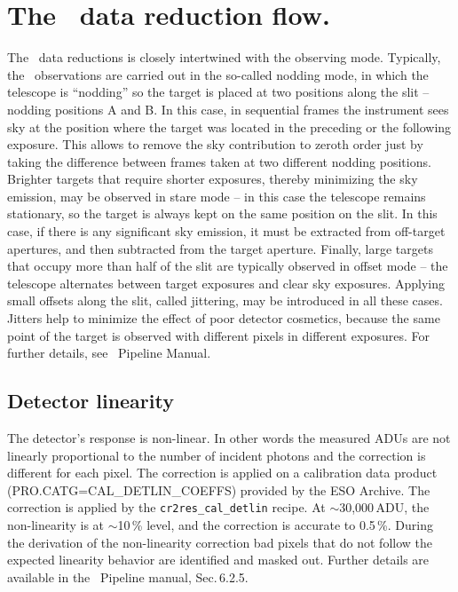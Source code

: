 \section{The \instname\ data reduction flow.}
\label{sec:reduction_flow}



The \instname\ data reductions is closely intertwined with the observing mode.
Typically, the \instname\ observations are carried out in the so-called nodding mode, in which the telescope is ``nodding'' so the target is placed at two positions along the slit -- nodding positions A and B. In this case, in sequential frames the instrument sees sky at the position where the target was located in the preceding or the following exposure. This allows to remove the sky contribution to zeroth order just by taking the difference between frames taken at two different nodding positions. Brighter targets that require shorter exposures, thereby minimizing the sky emission, may be observed in stare mode -- in this case the telescope remains stationary, so the target is always kept on the same position on the slit. In this case, if there is any significant sky emission, it must be extracted from off-target apertures, and then subtracted from the target aperture. Finally, large targets that occupy more than half of the slit are typically observed in offset mode -- the telescope alternates between target exposures and clear sky exposures. Applying small offsets along the slit, called jittering, may be introduced in all these cases. Jitters help to minimize the effect of poor detector cosmetics, because the same point of the target is observed with different pixels in different exposures. For further details, see \instname\ Pipeline Manual.


\subsection{Detector linearity }

The detector's response is non-linear. In other words the measured ADUs are not linearly proportional to the number of incident photons and the correction is different for each pixel.
The correction is applied on a calibration data product (PRO.CATG=CAL\_DETLIN\_COEFFS) provided by the ESO Archive. The correction is applied by the {\tt cr2res\_cal\_detlin} recipe. At $\sim$30,000\,ADU, the non-linearity is at $\sim$10\,\% level, and the correction is accurate to 0.5\,\%. During the derivation of the non-linearity correction bad pixels that do not follow the expected linearity behavior are identified and masked out. Further details are available in the \instname\ Pipeline manual, Sec.\,6.2.5. 


